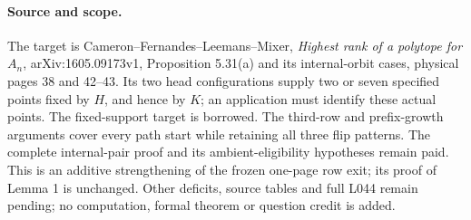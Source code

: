 \documentclass[11pt,a4paper]{article}
\begin{document}
\paragraph{Source and scope.}
The target is Cameron--Fernandes--Leemans--Mixer,
\emph{Highest rank of a polytope for $A_n$}, arXiv:1605.09173v1,
Proposition 5.31(a) and its internal-orbit cases, physical
pages 38 and 42--43. Its two head configurations supply two or
seven specified points fixed by $H$, and hence by $K$; an
application must identify these actual points. The fixed-support
target is borrowed. The third-row and prefix-growth arguments
cover every path start while retaining all three flip patterns.
The complete internal-pair proof and its ambient-eligibility
hypotheses remain paid. This is an additive strengthening of the
frozen one-page row exit; its proof of Lemma 1 is unchanged.
Other deficits, source tables and full L044 remain pending;
no computation, formal theorem or question credit is added.
\end{document}
